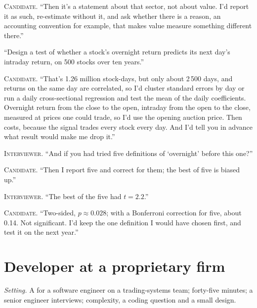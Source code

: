 \noindent\textsc{Candidate.} ``Then it's a statement about that sector, not about value. I'd report it as such, re-estimate without it,
and ask whether there is a reason, an accounting convention for example, that makes value measure something different there.''


\begin{interviewq}\label{iq:iv:mock-interviews:6}
``Design a test of whether a stock's overnight return predicts its next day's intraday return, on 500 stocks over ten years.''
\end{interviewq}

\noindent\textsc{Candidate.} ``That's 1.26 million stock-days, but only about 2\,500 days, and returns on the same day are
correlated, so I'd cluster standard errors by day or run a daily cross-sectional regression and test the mean of the daily
coefficients. Overnight return from the close to the open, intraday from the open to the close, measured at prices one could
trade, so I'd use the opening auction price. Then costs, because the signal trades every stock every day. And I'd tell you in
advance what result would make me drop it.''

\noindent\textsc{Interviewer.} ``And if you had tried five definitions of `overnight' before this one?''

\noindent\textsc{Candidate.} ``Then I report five and correct for them; the best of five is biased up.''

\noindent\textsc{Interviewer.} ``The best of the five had $t = 2.2$.''

\noindent\textsc{Candidate.} ``Two-sided, $p \approx 0.028$; with a Bonferroni correction for five, about 0.14. Not significant. I'd
keep the one definition I would have chosen first, and test it on the next year.''


\section{Developer at a proprietary firm}

\emph{Setting.} A  for a software engineer on a trading-systems team; forty-five minutes; a senior engineer
interviews; complexity, a coding question and a small design.

